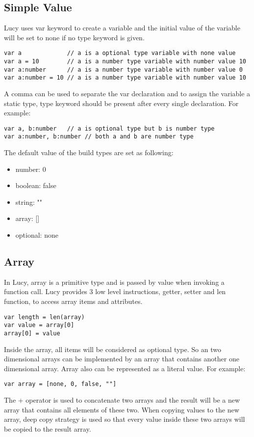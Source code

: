 \subsection{Simple Value}
Lucy uses var keyword to create a variable and the initial value of the variable will be set to none if no type keyword is given.
\begin{lstlisting}
var a             // a is a optional type variable with none value
var a = 10        // a is a number type variable with number value 10
var a:number      // a is a number type variable with number value 0
var a:number = 10 // a is a number type variable with number value 10
\end{lstlisting}
A comma can be used to separate the var declaration and to assign the variable a static type, type keyword should be present after every single declaration. For example:
\begin{lstlisting}
var a, b:number   // a is optional type but b is number type
var a:number, b:number // both a and b are number type
\end{lstlisting}
The default value of the build types are set as following:
\begin{itemize}
  \item number: 0
  \item boolean: false
  \item string: ""
  \item array: []
  \item optional: none
\end{itemize}

\subsection{Array}
In Lucy, array is a primitive type and is passed by value when invoking a function call. Lucy provides 3 low level instructions, getter, setter and len function, to access array items and attributes.
\begin{lstlisting}
var length = len(array)
var value = array[0]
array[0] = value
\end{lstlisting}
Inside the array, all items will be considered as optional type. So an two dimensional arrays can be implemented by an array that contains another one dimensional array. Array also can be represented as a literal value. For example:
\begin{lstlisting}
var array = [none, 0, false, ""]
\end{lstlisting}
The + operator is used to concatenate two arrays and the result will be a new array that contains all elements of these two. When copying values to the new array, deep copy strategy is used so that every value inside these two arrays will be copied to the result array.

